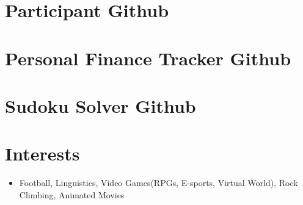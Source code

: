 \documentclass[letterpaper,11pt]{article}
\begin{document}
\section{Participant Github}
\textbf{}
\textbf{}
\textbf{}
\textbf{}





\section{Personal Finance Tracker Github}
\textbf{}
\textbf{}
\textbf{}
\textbf{}
\textbf{}
\textbf{}
\textbf{}
\textbf{}
\textbf{}
\textbf{}
\textbf{}





\section{Sudoku Solver Github}
\textbf{}
\textbf{}
\textbf{}
\textbf{}
\textbf{}
\textbf{}
\textbf{}
\textbf{}
\textbf{}







\section{Interests}
\begin{itemize}
  \item Football, Linguistics, Video Games(RPGs, E-sports, Virtual World), Rock Climbing, Animated Movies
\end{itemize}
\end{document}
